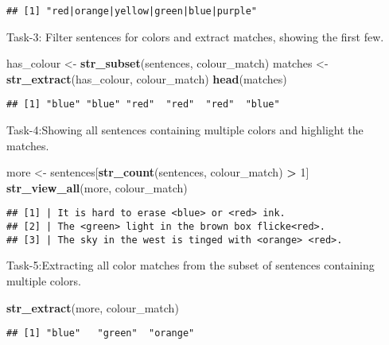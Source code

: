 \documentclass[
]{article}
\newenvironment{Shaded}{\begin{snugshade}}{\end{snugshade}}
\newcommand{\DecValTok}[1]{\textcolor[rgb]{0.00,0.00,0.81}{#1}}
\newcommand{\FunctionTok}[1]{\textcolor[rgb]{0.13,0.29,0.53}{\textbf{#1}}}
\newcommand{\NormalTok}[1]{#1}
\newcommand{\OtherTok}[1]{\textcolor[rgb]{0.56,0.35,0.01}{#1}}
\newcommand{\SpecialCharTok}[1]{\textcolor[rgb]{0.81,0.36,0.00}{\textbf{#1}}}
\begin{document}
\begin{verbatim}
## [1] "red|orange|yellow|green|blue|purple"
\end{verbatim}

Task-3: Filter sentences for colors and extract matches, showing the
first few.

\begin{Shaded}
\begin{Highlighting}[]
\NormalTok{has\_colour }\OtherTok{\textless{}{-}} \FunctionTok{str\_subset}\NormalTok{(sentences, colour\_match)}
\NormalTok{matches }\OtherTok{\textless{}{-}} \FunctionTok{str\_extract}\NormalTok{(has\_colour, colour\_match)}
\FunctionTok{head}\NormalTok{(matches)}
\end{Highlighting}
\end{Shaded}

\begin{verbatim}
## [1] "blue" "blue" "red"  "red"  "red"  "blue"
\end{verbatim}

Task-4:Showing all sentences containing multiple colors and highlight
the matches.

\begin{Shaded}
\begin{Highlighting}[]
\NormalTok{more }\OtherTok{\textless{}{-}}\NormalTok{ sentences[}\FunctionTok{str\_count}\NormalTok{(sentences, colour\_match) }\SpecialCharTok{\textgreater{}} \DecValTok{1}\NormalTok{]}
\FunctionTok{str\_view\_all}\NormalTok{(more, colour\_match)}
\end{Highlighting}
\end{Shaded}

\begin{verbatim}
## [1] | It is hard to erase <blue> or <red> ink.
## [2] | The <green> light in the brown box flicke<red>.
## [3] | The sky in the west is tinged with <orange> <red>.
\end{verbatim}

Task-5:Extracting all color matches from the subset of sentences
containing multiple colors.

\begin{Shaded}
\begin{Highlighting}[]
\FunctionTok{str\_extract}\NormalTok{(more, colour\_match)}
\end{Highlighting}
\end{Shaded}

\begin{verbatim}
## [1] "blue"   "green"  "orange"
\end{verbatim}
\end{document}
